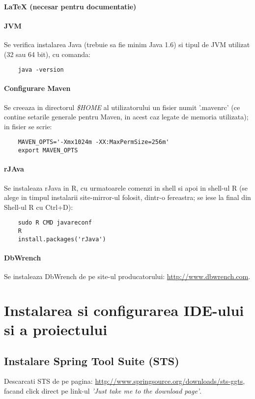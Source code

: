 \paragraph{LaTeX (necesar pentru documentatie)}

\paragraph{JVM}
\label{java_version}
Se verifica instalarea Java (trebuie sa fie minim Java 1.6) si tipul de JVM
utilizat (32 sau 64 bit), cu comanda:
\begin{lstlisting}
	java -version
\end{lstlisting}

\paragraph{Configurare Maven}
Se creeaza in directorul \emph{\$HOME} al utilizatorului un fisier numit
'.mavenrc' 
(ce contine setarile generale pentru Maven, in acest caz legate de memoria utilizata);
in fisier se scrie:
\begin{lstlisting}
	MAVEN_OPTS='-Xmx1024m -XX:MaxPermSize=256m'
	export MAVEN_OPTS
\end{lstlisting}

\paragraph{rJAva}
Se instaleaza rJava in R, cu urmatoarele comenzi in shell si apoi in shell-ul R
(se alege in timpul instalarii site-mirror-ul folosit, dintr-o fereastra;
se iese la final din Shell-ul R cu Ctrl+D):
\begin{lstlisting}
	sudo R CMD javareconf
	R
	install.packages('rJava')
\end{lstlisting}

\paragraph{DbWrench}
Se instaleaza DbWrench de pe site-ul producatorului:
\url{http://www.dbwrench.com}.

\section{Instalarea si configurarea IDE-ului si a proiectului}

\subsection{Instalare Spring Tool Suite (STS)}
Descarcati STS de pe pagina:
\url{http://www.springsource.org/downloads/sts-ggts},
facand click direct pe link-ul \emph{'Just take me to the download page'}.

